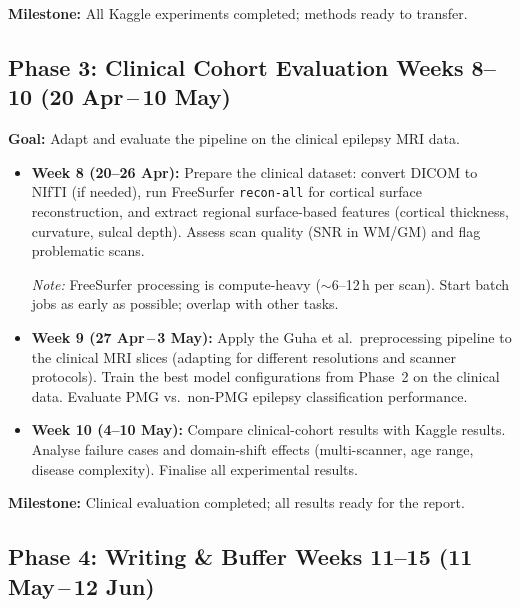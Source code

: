 \documentclass[a4paper,11pt]{article}
\begin{document}
\noindent\textbf{Milestone:} All Kaggle experiments completed; methods ready to transfer.

\subsection*{\textcolor{phase3}{Phase 3: Clinical Cohort Evaluation \hfill Weeks 8--10 {\normalfont(20 Apr\,--\,10 May)}}}

\textbf{Goal:} Adapt and evaluate the pipeline on the clinical epilepsy MRI data.

\begin{itemize}[leftmargin=*]
    \item \textbf{Week 8 (20--26 Apr):}
    Prepare the clinical dataset: convert DICOM to NIfTI (if needed), run FreeSurfer \texttt{recon-all} for cortical surface reconstruction, and extract regional surface-based features (cortical thickness, curvature, sulcal depth).
    Assess scan quality (SNR in WM/GM) and flag problematic scans.

    \textit{Note:} FreeSurfer processing is compute-heavy ($\sim$6--12\,h per scan). Start batch jobs as early as possible; overlap with other tasks.

    \item \textbf{Week 9 (27 Apr\,--\,3 May):}
    Apply the Guha et al.\ preprocessing pipeline to the clinical MRI slices (adapting for different resolutions and scanner protocols).
    Train the best model configurations from Phase~2 on the clinical data.
    Evaluate PMG vs.\ non-PMG epilepsy classification performance.

    \item \textbf{Week 10 (4--10 May):}
    Compare clinical-cohort results with Kaggle results.
    Analyse failure cases and domain-shift effects (multi-scanner, age range, disease complexity).
    Finalise all experimental results.
\end{itemize}

\noindent\textbf{Milestone:} Clinical evaluation completed; all results ready for the report.

\subsection*{\textcolor{phase3}{Phase 4: Writing \& Buffer \hfill Weeks 11--15 {\normalfont(11 May\,--\,12 Jun)}}}
\end{document}
